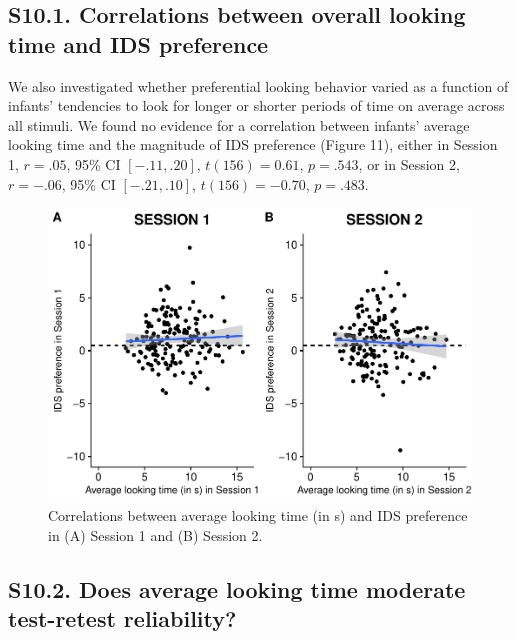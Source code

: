 \documentclass[
  man, donotrepeattitle,floatsintext]{apa6}
\begin{document}
\hypertarget{s10.1.-correlations-between-overall-looking-time-and-ids-preference}{%
\subsection{S10.1. Correlations between overall looking time and IDS preference}\label{s10.1.-correlations-between-overall-looking-time-and-ids-preference}}

We also investigated whether preferential looking behavior varied as a function of infants' tendencies to look for longer or shorter periods of time on average across all stimuli. We found no evidence for a correlation between infants' average looking time and the magnitude of IDS preference (Figure 11), either in Session 1, \(r = .05\), 95\% CI \([-.11, .20]\), \(t(156) = 0.61\), \(p = .543\), or in Session 2, \(r = -.06\), 95\% CI \([-.21, .10]\), \(t(156) = -0.70\), \(p = .483\).

\begin{figure}

{\centering \includegraphics{MB1T_supplement_files/figure-latex/fig11-1} 

}

\caption{Correlations between average looking time (in s) and IDS preference in (A) Session 1 and (B) Session 2.}\label{fig:fig11}
\end{figure}

\hypertarget{s10.2.-does-average-looking-time-moderate-test-retest-reliability}{%
\subsection{S10.2. Does average looking time moderate test-retest reliability?}\label{s10.2.-does-average-looking-time-moderate-test-retest-reliability}}
\end{document}
